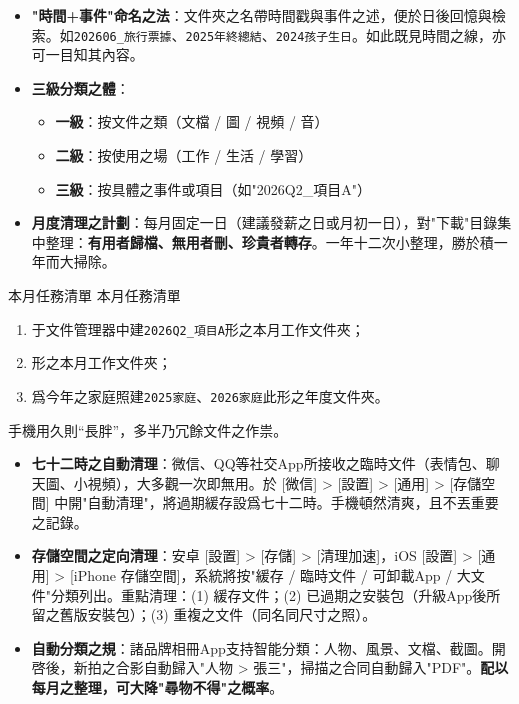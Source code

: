 \begin{itemize}
  \item \textbf{"時間+事件"命名之法}：文件夾之名帶時間戳與事件之述，便於日後回憶與檢索。如\texttt{202606\_旅行票據}、\texttt{2025年終總結}、\texttt{2024孩子生日}。如此既見時間之線，亦可一目知其內容。
  \item \textbf{三級分類之體}：
  \begin{itemize}
    \item \textbf{一級}：按文件之類（文檔 / 圖 / 視頻 / 音）
    \item \textbf{二級}：按使用之場（工作 / 生活 / 學習）
    \item \textbf{三級}：按具體之事件或項目（如"2026Q2\_項目A"）
  \end{itemize}
  \item \textbf{月度清理之計劃}：每月固定一日（建議發薪之日或月初一日），對"下載"目錄集中整理：\textbf{有用者歸檔、無用者刪、珍貴者轉存}。一年十二次小整理，勝於積一年而大掃除。
\end{itemize}

\begin{tcbpractice}{本月任務清單}
本月任務清單

\begin{enumerate}
  \item 于文件管理器中建\texttt{2026Q2\_項目A}形之本月工作文件夾；
  \item 形之本月工作文件夾；
  \item 爲今年之家庭照建\texttt{2025家庭}、\texttt{2026家庭}此形之年度文件夾。
\end{enumerate}

\end{tcbpractice}


手機用久則“長胖”，多半乃冗餘文件之作祟。

\begin{itemize}
  \item \textbf{七十二時之自動清理}：微信、QQ等社交App所接收之臨時文件（表情包、聊天圖、小視頻），大多觀一次即無用。於 [微信] > [設置] > [通用] > [存儲空間] 中開"自動清理"，將過期緩存設爲七十二時。手機頓然清爽，且不丟重要之記錄。
  \item \textbf{存儲空間之定向清理}：安卓 [設置] > [存儲] > [清理加速]，iOS [設置] > [通用] > [iPhone 存儲空間]，系統將按"緩存 / 臨時文件 / 可卸載App / 大文件"分類列出。重點清理：(1) 緩存文件；(2) 已過期之安裝包（升級App後所留之舊版安裝包）；(3) 重複之文件（同名同尺寸之照）。
  \item \textbf{自動分類之規}：諸品牌相冊App支持智能分類：人物、風景、文檔、截圖。開啓後，新拍之合影自動歸入"人物 > 張三"，掃描之合同自動歸入"PDF"。\textbf{配以每月之整理，可大降"尋物不得"之概率}。
\end{itemize}

